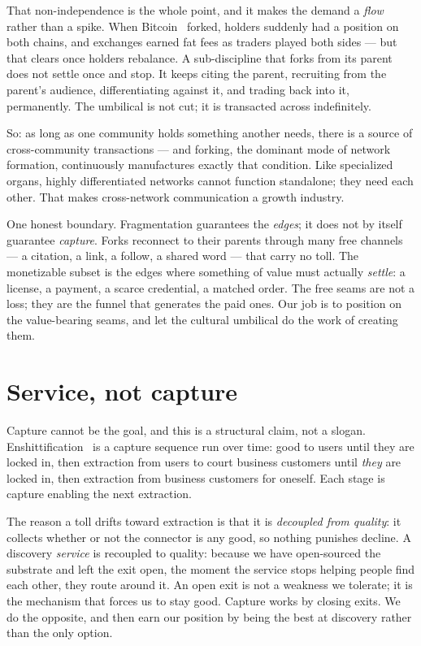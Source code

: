 \documentclass[11pt]{article}
\begin{document}
That non-independence is the whole point, and it makes the demand a \emph{flow} rather than a spike. When Bitcoin~\cite{nakamoto} forked, holders suddenly had a position on both chains, and exchanges earned fat fees as traders played both sides --- but that clears once holders rebalance. A sub-discipline that forks from its parent does not settle once and stop. It keeps citing the parent, recruiting from the parent's audience, differentiating against it, and trading back into it, permanently. The umbilical is not cut; it is transacted across indefinitely.

\begin{keybox}
So: as long as one community holds something another needs, there is a source of cross-community transactions --- and forking, the dominant mode of network formation, continuously manufactures exactly that condition. Like specialized organs, highly differentiated networks cannot function standalone; they need each other. That makes cross-network communication a growth industry.
\end{keybox}

One honest boundary. Fragmentation guarantees the \emph{edges}; it does not by itself guarantee \emph{capture}. Forks reconnect to their parents through many free channels --- a citation, a link, a follow, a shared word --- that carry no toll. The monetizable subset is the edges where something of value must actually \emph{settle}: a license, a payment, a scarce credential, a matched order. The free seams are not a loss; they are the funnel that generates the paid ones. Our job is to position on the value-bearing seams, and let the cultural umbilical do the work of creating them.

\section{Service, not capture}

Capture cannot be the goal, and this is a structural claim, not a slogan. Enshittification~\cite{doctorow} is a capture sequence run over time: good to users until they are locked in, then extraction from users to court business customers until \emph{they} are locked in, then extraction from business customers for oneself. Each stage is capture enabling the next extraction.

The reason a toll drifts toward extraction is that it is \emph{decoupled from quality}: it collects whether or not the connector is any good, so nothing punishes decline. A discovery \emph{service} is recoupled to quality: because we have open-sourced the substrate and left the exit open, the moment the service stops helping people find each other, they route around it. An open exit is not a weakness we tolerate; it is the mechanism that forces us to stay good. Capture works by closing exits. We do the opposite, and then earn our position by being the best at discovery rather than the only option.
\end{document}
